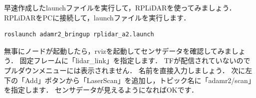 \documentclass[{../../master}]{subfiles}
\begin{document}
早速作成したlaunchファイルを実行して，RPLiDARを使ってみましょう．
RPLiDARをPCに接続して，launchファイルを実行します．

\begin{lstlisting}[language=sh, caption=Launch \textsf{rplidar\_a2.launch}]
roslaunch adamr2_bringup rplidar_a2.launch
\end{lstlisting}

無事にノードが起動したら，\textsf{rviz}を起動してセンサデータを確認してみましょう．
固定フレームに「\textsf{lidar\_link}」を指定します．
TFが配信されていないのでプルダウンメニューには表示されません．
名前を直接入力しましょう．
次に左下の「Add」ボタンから「LaserScan」を追加し，トピック名に「\textsf{adamr2/scan}」を指定します．
センサデータが見えるようになればOKです．
\end{document}
